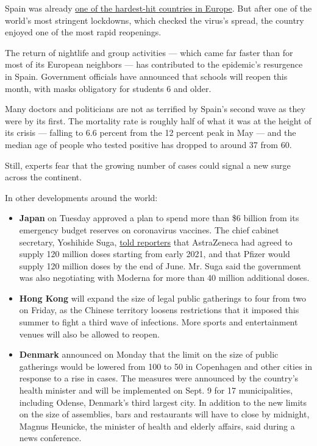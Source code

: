 Spain was already
\href{https://www.nytimes3xbfgragh.onion/2020/04/07/world/europe/spain-coronavirus.html}{one
of the hardest-hit countries in Europe}. But after one of the world's
most stringent lockdowns, which checked the virus's spread, the country
enjoyed one of the most rapid reopenings.

The return of nightlife and group activities --- which came far faster
than for most of its European neighbors --- has contributed to the
epidemic's resurgence in Spain. Government officials have announced that
schools will reopen this month, with masks obligatory for students 6 and
older.

Many doctors and politicians are not as terrified by Spain's second wave
as they were by its first. The mortality rate is roughly half of what it
was at the height of its crisis --- falling to 6.6 percent from the 12
percent peak in May --- and the median age of people who tested positive
has dropped to around 37 from 60.

Still, experts fear that the growing number of cases could signal a new
surge across the continent.

In other developments around the world:

\begin{itemize}
\item
  \textbf{Japan} on Tuesday approved a plan to spend more than \$6
  billion from its emergency budget reserves on coronavirus vaccines.
  The chief cabinet secretary, Yoshihide Suga,
  \href{http://www.kantei.go.jp/jp/tyoukanpress/202009/8_a.html}{told
  reporters} that AstraZeneca had agreed to supply 120 million doses
  starting from early 2021, and that Pfizer would supply 120 million
  doses by the end of June. Mr. Suga said the government was also
  negotiating with Moderna for more than 40 million additional doses.
\item
  \textbf{Hong Kong} will expand the size of legal public gatherings to
  four from two on Friday, as the Chinese territory loosens restrictions
  that it imposed this summer to fight a third wave of infections. More
  sports and entertainment venues will also be allowed to reopen.
\item
  \textbf{Denmark} announced on Monday that the limit on the size of
  public gatherings would be lowered from 100 to 50 in Copenhagen and
  other cities in response to a rise in cases. The measures were
  announced by the country's health minister and will be implemented on
  Sept. 9 for 17 municipalities, including Odense, Denmark's third
  largest city. In addition to the new limits on the size of assemblies,
  bars and restaurants will have to close by midnight, Magnus Heunicke,
  the minister of health and elderly affairs, said during a news
  conference.
\end{itemize}

